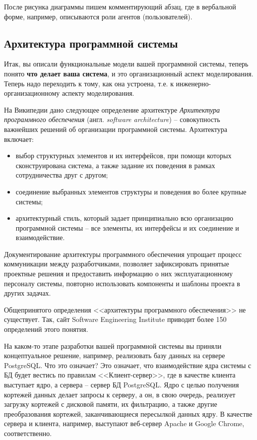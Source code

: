 \documentclass[a4paper,14pt,final]{extreport}
\begin{document}
После рисунка диаграммы пишем комментирующий абзац, где в вербальной форме, например, описываются роли агентов (пользователей).

\subsection{Архитектура программной системы}
\label{sec:architecture}

Итак, вы описали функциональные модели вашей программной системы, теперь понято \textbf{что делает ваша система}, и это организационный аспект моделирования.  Теперь надо переходить к тому, как она устроена, т.е. к инженерно-организационному аспекту моделирования.

На Википедии дано следующее определение архитектуре \cite{wiki:architecture} %
\emph{Архитектура программного обеспечения} (англ. \emph{software architecture}) -- совокупность важнейших решений об организации программной системы.  Архитектура включает:
\begin{itemize}
\item выбор структурных элементов и их интерфейсов, при помощи которых сконструирована система, а также задание их поведения в рамках сотрудничества друг с другом;
\item соединение выбранных элементов структуры и поведения во более крупные системы;
\item архитектурный стиль, который задает принципиально всю организацию программной системы -- все элементы, их интерфейсы и их соединение и взаимодействие.
\end{itemize}
Документирование архитектуры программного обеспечения упрощает процесс коммуникации между разработчиками, позволяет зафиксировать принятые проектные решения и предоставить информацию о них эксплуатационному персоналу системы, повторно использовать компоненты и шаблоны проекта в других задачах.

Общепринятого определения <<архитектуры программного обеспечения>> не существует.  Так, сайт Software Engineering Institute приводит более 150 определений этого понятия.

На каком-то этапе разработки вашей программной системы вы приняли концептуальное решение, например, реализовать базу данных на сервере PostgreSQL.  Что это означает?  Это означает, что взаимодействие ядра системы с БД будет вестись по правилам <<Клиент-сервер>>, где в качестве клиента выступает ядро, а сервера -- сервер БД PostgreSQL.  Ядро с целью получения кортежей данных делает запросы к серверу, а он, в свою очередь, реализует загрузку кортежей с дисковой памяти, их фильтрацию, а также другие преобразования кортежей, заканчивающиеся пересылкой данных ядру.  В качестве сервера и клиента, например, выступают веб-сервер Apache и Google Chrome, соответственно.
\end{document}
